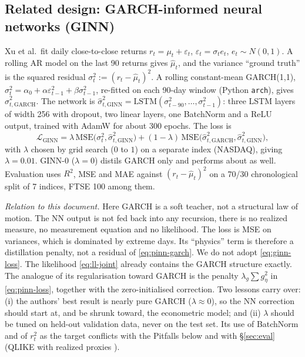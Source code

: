 \documentclass[11pt]{article}
\begin{document}
\subsection{Related design: GARCH-informed neural networks (GINN) \cite{Xu2024}}
Xu et al.\ fit daily close-to-close returns $r_t=\mu_t+\varepsilon_t$, $\varepsilon_t=\sigma_t e_t$,
$e_t\sim N(0,1)$. A rolling AR model on the last 90 returns gives $\hat\mu_t$, and the variance
``ground truth'' is the squared residual $\sigma^2_t:=(r_t-\hat\mu_t)^2$. A rolling constant-mean
GARCH(1,1), $\sigma_t^2=\alpha_0+\alpha\varepsilon_{t-1}^2+\beta\sigma_{t-1}^2$, re-fitted on each
90-day window (Python \texttt{arch}), gives $\hat\sigma^2_{t,\mathrm{GARCH}}$. The network is
$\hat\sigma^2_{t,\mathrm{GINN}}=\mathrm{LSTM}(\sigma^2_{t-90},\dots,\sigma^2_{t-1})$: three LSTM layers of width
256 with dropout, two linear layers, one BatchNorm and a ReLU output, trained with AdamW for about 300
epochs. The loss is
\begin{equation}\label{eq:ginn-loss}
\mathcal L_{\mathrm{GINN}}=\lambda\,\mathrm{MSE}\bigl(\sigma^2_t,\hat\sigma^2_{t,\mathrm{GINN}}\bigr)
+(1-\lambda)\,\mathrm{MSE}\bigl(\hat\sigma^2_{t,\mathrm{GARCH}},\hat\sigma^2_{t,\mathrm{GINN}}\bigr),
\end{equation}
with $\lambda$ chosen by grid search ($0$ to $1$) on a separate index (NASDAQ), giving $\lambda=0.01$.
GINN-0 ($\lambda=0$) distils GARCH only and performs about as well. Evaluation uses
$R^2$, MSE and MAE against $(r_t-\hat\mu_t)^2$ on a 70/30 chronological split of 7 indices,
FTSE 100 among them.

\emph{Relation to this document.} Here GARCH is a soft teacher, not a structural law of motion. The
NN output is not fed back into any recursion, there is no realized measure, no measurement equation
and no likelihood. The loss is MSE on variances, which is dominated by extreme days. Its
``physics'' term is therefore a distillation penalty, not a residual of \eqref{eq:pinn-garch}. We do
not adopt \eqref{eq:ginn-loss}. The likelihood \eqref{eq:ll-joint} already contains the GARCH
structure exactly. The analogue of its regularisation toward GARCH is the penalty $\lambda_g\sum g_\eta^2$
in \eqref{eq:pinn-loss}, together with the zero-initialised correction. Two lessons carry over:
(i) the authors' best result is nearly pure GARCH ($\lambda\approx0$), so the NN correction should
start at, and be shrunk toward, the econometric model; and (ii) $\lambda$ should be tuned on held-out
validation data, never on the test set. Its use of BatchNorm and of $r_t^2$ as the target conflicts with
the Pitfalls below and with \S\ref{sec:eval} (QLIKE with realized proxies \cite{Patton2011}).
\end{document}
